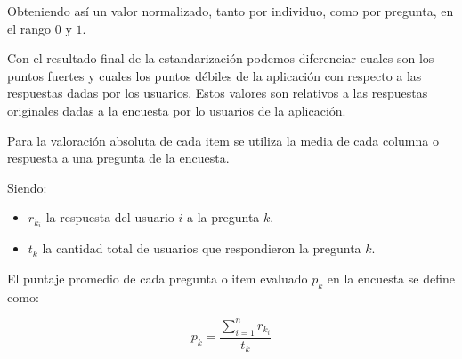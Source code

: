 Obteniendo así un valor normalizado, tanto por individuo, como por pregunta, en
el rango $0$ y $1$.

Con el resultado final de la estandarización podemos diferenciar cuales son los
puntos fuertes y cuales los puntos débiles de la aplicación con respecto a las
respuestas dadas por los usuarios. Estos valores son relativos a las respuestas
originales dadas a la encuesta por lo usuarios de la aplicación.

Para la valoración absoluta de cada  item se utiliza la media de cada columna o
respuesta a una pregunta de la encuesta.

Siendo:
\begin{itemize} 
\item $r_{k_i}$ la respuesta del usuario $i$ a la pregunta $k$.
\item $t_k$ la cantidad total de usuarios que respondieron la pregunta $k$.
\end{itemize}

El puntaje promedio de cada pregunta o item evaluado  $p_k$ en la encuesta se
define como:

\begin{equation*}
p_k = \frac{\sum_{i=1}^n{r_k_i}}{t_k}
\end{equation*}


